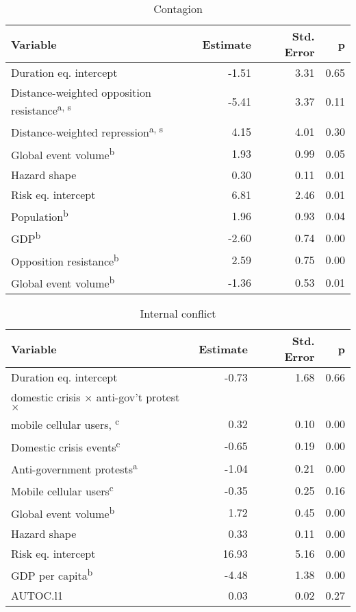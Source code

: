 \begin{table}[ht]
\centering
\caption{Contagion} 
\label{theme5}
\begin{tabular}{p{3in}rrr}
  \toprule
Variable & Estimate & Std. Error & p \\ 
  \midrule
Duration eq. intercept & -1.51 & 3.31 & 0.65 \\ 
  Distance-weighted opposition resistance\textsuperscript{a, s} & -5.41 & 3.37 & 0.11 \\ 
  Distance-weighted repression\textsuperscript{a, s} & 4.15 & 4.01 & 0.30 \\ 
  Global event volume\textsuperscript{b} & 1.93 & 0.99 & 0.05 \\ 
  Hazard shape & 0.30 & 0.11 & 0.01 \\ 
  \midrule Risk eq. intercept & 6.81 & 2.46 & 0.01 \\ 
  Population\textsuperscript{b} & 1.96 & 0.93 & 0.04 \\ 
  GDP\textsuperscript{b} & -2.60 & 0.74 & 0.00 \\ 
  Opposition resistance\textsuperscript{b} & 2.59 & 0.75 & 0.00 \\ 
  Global event volume\textsuperscript{b} & -1.36 & 0.53 & 0.01 \\ 
   \bottomrule
\end{tabular}
\end{table}

\begin{table}[ht]
\centering
\caption{Internal conflict} 
\label{theme6}
\begin{tabular}{p{3in}rrr}
  \toprule
Variable & Estimate & Std. Error & p \\ 
  \midrule
Duration eq. intercept & -0.73 & 1.68 & 0.66 \\ 
  domestic crisis \(\times\) anti-gov't protest \(\times\) \\ mobile cellular users, \textsuperscript{c} & 0.32 & 0.10 & 0.00 \\ 
  Domestic crisis events\textsuperscript{c} & -0.65 & 0.19 & 0.00 \\ 
  Anti-government protests\textsuperscript{a} & -1.04 & 0.21 & 0.00 \\ 
  Mobile cellular users\textsuperscript{c} & -0.35 & 0.25 & 0.16 \\ 
  Global event volume\textsuperscript{b} & 1.72 & 0.45 & 0.00 \\ 
  Hazard shape & 0.33 & 0.11 & 0.00 \\ 
  \midrule Risk eq. intercept & 16.93 & 5.16 & 0.00 \\ 
  GDP per capita\textsuperscript{b} & -4.48 & 1.38 & 0.00 \\ 
  AUTOC.l1 & 0.03 & 0.02 & 0.27 \\ 
   \bottomrule
\end{tabular}
\end{table}

